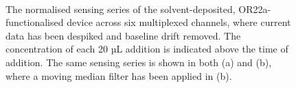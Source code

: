 \documentclass[
  a4paper,
]{scrbook}
\begin{document}
\begin{figure}
\begin{minipage}[t]{0.70\linewidth}
{{}

}

\end{minipage}%
%
\begin{minipage}[t]{0.15\linewidth}

{\centering 

~

}

\end{minipage}%

\caption{\label{fig-solvent-deposited-sensing}The normalised sensing
series of the solvent-deposited, OR22a-functionalised device across six
multiplexed channels, where current data has been despiked and baseline
drift removed. The concentration of each 20 µL addition is indicated
above the time of addition. The same sensing series is shown in both (a)
and (b), where a moving median filter has been applied in (b).}

\end{figure}
\end{document}
